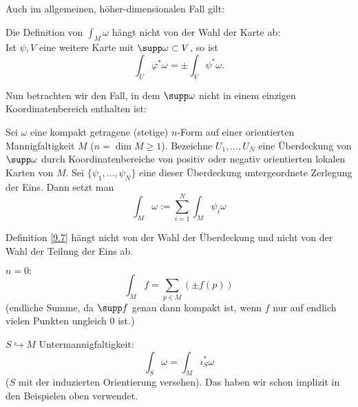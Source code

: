 Auch im allgemeinen, höher-dimensionalen Fall gilt:

\begin{lem}\autolabel
	Die Definition von $\int_M \omega$ hängt nicht von der Wahl der Karte ab:\\
	Ist \( \psi,V \) eine weitere Karte mit $\supp \omega \subset V$, so ist
	\[ \int_U \varphi^*\omega = \pm \int_V \psi^*\omega. \]
\end{lem}

Nun betrachten wir den Fall, in dem $\supp \omega$ nicht in einem einzigen Koordinatenbereich enthalten ist:

\begin{defn}\autolabel
	Sei $\omega$ eine kompakt getragene (stetige) $n$-Form auf einer orientierten Mannigfaltigkeit $M$ ($n = \dim M \geq 1$). Bezeichne \( U_1, \dotsc, U_N \) eine Überdeckung von $\supp \omega$ durch Koordinatenbereiche von positiv oder negativ orientierten lokalen Karten von $M$. Sei \( \{\psi_1, \dotsc, \psi_N\} \) eine dieser Überdeckung untergeordnete Zerlegung der Eins. Dann setzt man
	\[ \int_M \omega := \sum_{i=1}^{N} \int_M \psi_i \omega \]
\end{defn}

\begin{lem}\autolabel
	Definition \ref{9.7} hängt nicht von der Wahl der Überdeckung und nicht von der Wahl der Teilung der Eins ab.
\end{lem}

\begin{rem*}
	\( n=0: \)\[ \int_M f = \sum_{p \in M} (\pm f(p)) \]
	(endliche Summe, da $\supp f$ genau dann kompakt ist, wenn $f$ nur auf endlich vielen Punkten ungleich 0 ist.)
\end{rem*}

\begin{rem}\autolabel
	\( S \hookrightarrow M \) Untermannigfaltigkeit:
	\[ \int_S \omega = \int_M \iota_S^*\omega \]
	($S$ mit der induzierten Orientierung versehen). Das haben wir schon implizit in den Beispielen oben verwendet.
\end{rem}

